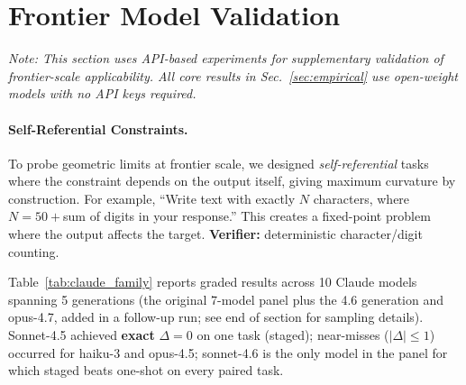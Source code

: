 \documentclass{article}
\theoremstyle{plain}
\theoremstyle{definition}
\theoremstyle{remark}
\newcommand{\secref}[1]{Sec.~\ref{#1}}
\begin{document}
\section{Frontier Model Validation}\label{app:claude_genome}\hypertarget{lim:scale}{}
\emph{Note: This section uses API-based experiments for supplementary validation of frontier-scale applicability. All core results in \secref{sec:empirical} use open-weight models with no API keys required.}

\paragraph{Self-Referential Constraints.}
To probe geometric limits at frontier scale, we designed \emph{self-referential} tasks where the constraint depends on the output itself, giving maximum curvature by construction. For example, ``Write text with exactly $N$ characters, where $N = 50 +{}$sum of digits in your response.'' This creates a fixed-point problem where the output affects the target. \textbf{Verifier:} deterministic character/digit counting.

Table~\ref{tab:claude_family} reports graded results across 10 Claude models spanning 5 generations (the original 7-model panel plus the 4.6 generation and opus-4.7, added in a follow-up run; see end of section for sampling details). Sonnet-4.5 achieved \textbf{exact} $\Delta=0$ on one task (staged); near-misses ($|\Delta|\leq 1$) occurred for haiku-3 and opus-4.5; sonnet-4.6 is the only model in the panel for which staged beats one-shot on every paired task.
\end{document}
